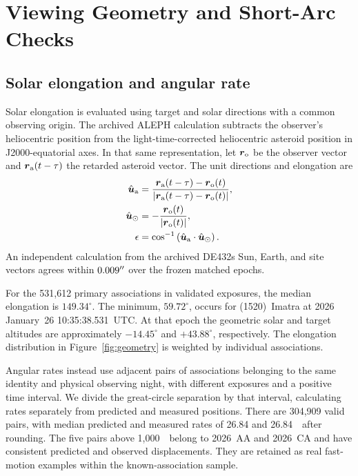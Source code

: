 \appendix
\setcounter{figure}{0}
\renewcommand{\thefigure}{A\arabic{figure}}
\renewcommand{\theHfigure}{A.\arabic{figure}}
\renewcommand{\theHequation}{A.\arabic{equation}}
\section{Viewing Geometry and Short-Arc Checks}
\label{app:checks}

\subsection{Solar elongation and angular rate}
\label{app:geometry}

Solar elongation is evaluated using target and
solar directions with a common observing
origin. The archived ALEPH calculation
subtracts the observer's heliocentric
position from the light-time-corrected
heliocentric asteroid position in
J2000-equatorial axes. In that same
representation, let $\boldsymbol{r}_{\rm o}$
be the observer vector and
$\boldsymbol{r}_{\rm a}(t-\tau)$ the
retarded asteroid vector. The unit
directions and elongation are
\begin{align}
\hat{\boldsymbol{u}}_{\rm a} &=
\frac{\boldsymbol{r}_{\rm a}(t-\tau)-\boldsymbol{r}_{\rm o}(t)}
 {|\boldsymbol{r}_{\rm a}(t-\tau)-\boldsymbol{r}_{\rm o}(t)|},\\
\hat{\boldsymbol{u}}_\odot &=
-\frac{\boldsymbol{r}_{\rm o}(t)}{|\boldsymbol{r}_{\rm o}(t)|},\\
\epsilon &= \cos^{-1}
  \left(\hat{\boldsymbol{u}}_{\rm a}\cdot
        \hat{\boldsymbol{u}}_\odot\right).
\end{align}
An independent calculation from the
archived DE432s Sun, Earth, and site
vectors agrees within $0.009^{\prime\prime}$
over the frozen matched epochs.

For the 531,612 primary associations
in validated exposures, the median
elongation is $149.34^\circ$. The
minimum, $59.72^\circ$, occurs for
(1520)~Imatra at 2026 January~26
10:35:38.531~UTC. At that epoch the
geometric solar and target altitudes
are approximately $-14.45^\circ$
and $+43.88^\circ$, respectively.
The elongation distribution in
Figure~\ref{fig:geometry} is weighted
by individual associations.

Angular rates instead use adjacent
pairs of associations belonging
to the same identity and physical
observing night, with different
exposures and a positive time
interval. We divide the great-circle
separation by that interval,
calculating rates separately from
predicted and measured positions.
There are 304,909 valid pairs,
with median predicted and measured
rates of 26.84 and
26.84~\rateunit\ after rounding.
The five pairs above
1,000~\rateunit\ belong to
2026~AA and 2026~CA and have
consistent predicted and observed
displacements. They are retained
as real fast-motion examples
within the known-association
sample.

